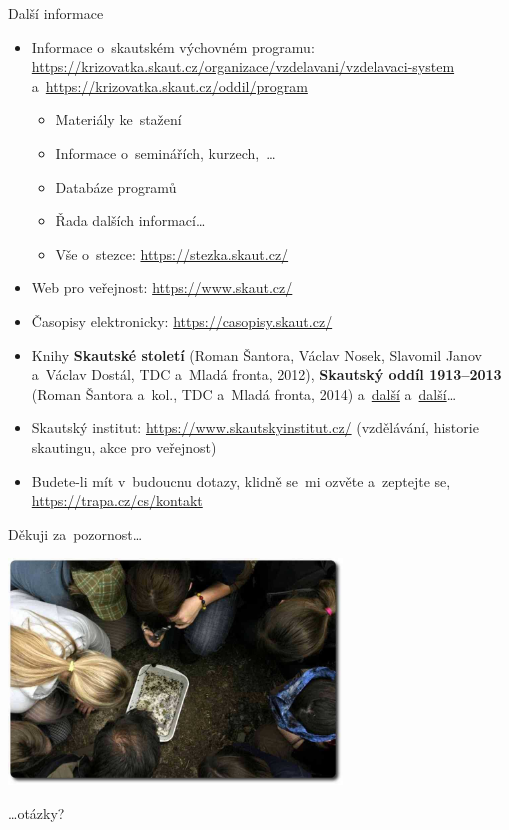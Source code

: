 \documentclass[compress, ucs, xelatex, 11pt, xcolor=dvipsnames, print, aspectratio=169,
	hyperref={
		bookmarks=true,
		unicode=true,
		colorlinks=true,
		pdftitle={Skautska vychovna metoda},
		plainpages=false,
		pdfauthor={Vojtech Zeisek},
		pdfsubject={Skautska vychovna metoda a jeji vyvoj za posledni stoleti a desetileti},
		pdfcreator={XeLaTeX},
		pdfkeywords={Junak, Pedagogika, Skaut, Skauting, Vychovna metoda},
		linkcolor=Red, %
		anchorcolor=ForestGreen, %
		citecolor=ForestGreen, %
		filecolor=ForestGreen, %
		menucolor=ForestGreen, %
		urlcolor=Sepia, %
		pdftex},
	url={hyphens, lowtilde} %
	]{beamer}
\begin{document}
\begin{frame}[allowframebreaks]{Další informace}
	\begin{itemize}
		\item Informace o~skautském výchovném programu: \url{https://krizovatka.skaut.cz/organizace/vzdelavani/vzdelavaci-system} a~\url{https://krizovatka.skaut.cz/oddil/program}
		\begin{itemize}
			\item Materiály ke~stažení
			\item Informace o~seminářích, kurzech,~\ldots
			\item Databáze programů
			\item Řada dalších informací\ldots
			\item Vše o~stezce: \url{https://stezka.skaut.cz/}
		\end{itemize}
		\item Web pro veřejnost: \url{https://www.skaut.cz/}
		\item Časopisy elektronicky: \url{https://casopisy.skaut.cz/}
		\item Knihy \textbf{Skautské století} (Roman Šantora, Václav Nosek, Slavomil Janov a~Václav Dostál, TDC a~Mladá fronta, 2012), \textbf{Skautský oddíl 1913--2013} (Roman Šantora a~kol., TDC a~Mladá fronta, 2014) a~\href{https://www.obchod.skaut.cz/propagace/publikace/}{další} a~\href{https://www.junshop.cz/volny-cas/knihy/}{další}\ldots
		\item Skautský institut: \url{https://www.skautskyinstitut.cz/} (vzdělávání, historie skautingu, akce pro veřejnost)
		\item Budete-li mít v~budoucnu dotazy, klidně se~mi ozvěte a~zeptejte se, \url{https://trapa.cz/cs/kontakt}
	\end{itemize}
\end{frame}

\begin{frame}{Děkuji za~pozornost\ldots}
	\begin{center}
		\includegraphics[height=6cm]{zaver.jpg}
	\end{center}
	\begin{flushright}
		\begin{large}
			\ldots otázky?
		\end{large}
	\end{flushright}
\end{frame}
\end{document}
